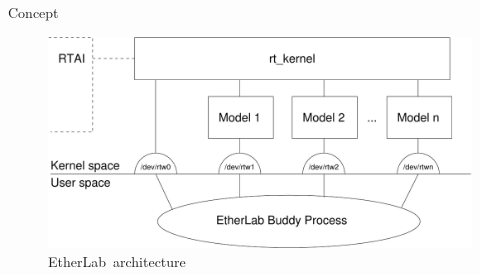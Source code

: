 \begin{ighsec}{Concept}
\begin{figure}[H]
  \begin{center}
    \includegraphics[width=\textwidth]{images/etl-arch}
    \caption{EtherLab\regTM\ architecture}
    \label{fig:architektur}
  \end{center}
\end{figure}

\end{ighsec}


